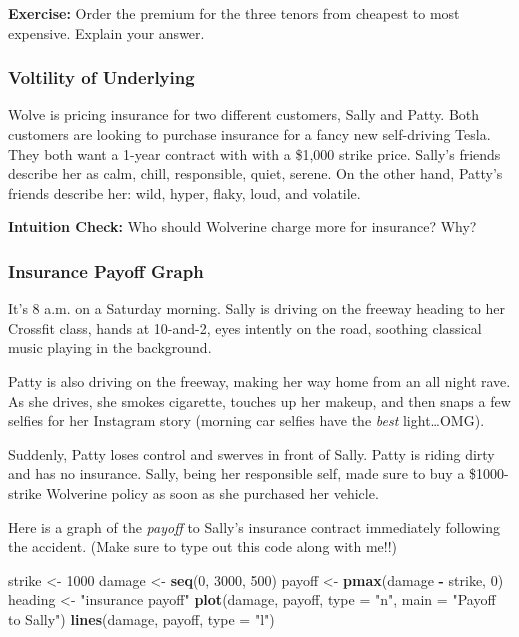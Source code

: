 \documentclass[11pt,]{krantz}
\makeatletter
\newenvironment{Shaded}{\begin{snugshade}}{\end{snugshade}}
\newcommand{\KeywordTok}[1]{\textcolor[rgb]{0.13,0.29,0.53}{\textbf{#1}}}
\newcommand{\DataTypeTok}[1]{\textcolor[rgb]{0.13,0.29,0.53}{#1}}
\newcommand{\DecValTok}[1]{\textcolor[rgb]{0.00,0.00,0.81}{#1}}
\newcommand{\StringTok}[1]{\textcolor[rgb]{0.31,0.60,0.02}{#1}}
\newcommand{\OperatorTok}[1]{\textcolor[rgb]{0.81,0.36,0.00}{\textbf{#1}}}
\newcommand{\NormalTok}[1]{#1}
\newenvironment{kframe}{%
\medskip{}
\setlength{\fboxsep}{.8em}
 \def\at@end@of@kframe{}%
 \ifinner\ifhmode%
  \def\at@end@of@kframe{\end{minipage}}%
  \begin{minipage}{\columnwidth}%
 \fi\fi%
 \def\FrameCommand##1{\hskip\@totalleftmargin \hskip-\fboxsep
 \colorbox{shadecolor}{##1}\hskip-\fboxsep
     \hskip-\linewidth \hskip-\@totalleftmargin \hskip\columnwidth}%
 \MakeFramed {\advance\hsize-\width
   \@totalleftmargin\z@ \linewidth\hsize
   \@setminipage}}%
 {\par\unskip\endMakeFramed%
 \at@end@of@kframe}
\renewenvironment{Shaded}{\begin{kframe}}{\end{kframe}}
\makeatother
\begin{document}
\textbf{Exercise:} Order the premium for the three tenors from cheapest to most expensive. Explain your answer.

\subsubsection*{Voltility of Underlying}\label{voltility-of-underlying}

Wolve is pricing insurance for two different customers, Sally and Patty. Both customers are looking to purchase insurance for a fancy new self-driving Tesla. They both want a 1-year contract with with a \$1,000 strike price. Sally's friends describe her as calm, chill, responsible, quiet, serene. On the other hand, Patty's friends describe her: wild, hyper, flaky, loud, and volatile.

\textbf{Intuition Check:} Who should Wolverine charge more for insurance? Why?

\subsubsection*{Insurance Payoff Graph}\label{insurance-payoff-graph}

It's 8 a.m. on a Saturday morning. Sally is driving on the freeway heading to her Crossfit class, hands at 10-and-2, eyes intently on the road, soothing classical music playing in the background.

Patty is also driving on the freeway, making her way home from an all night rave. As she drives, she smokes cigarette, touches up her makeup, and then snaps a few selfies for her Instagram story (morning car selfies have the \emph{best} light\ldots{}OMG).

Suddenly, Patty loses control and swerves in front of Sally. Patty is riding dirty and has no insurance. Sally, being her responsible self, made sure to buy a \$1000-strike Wolverine policy as soon as she purchased her vehicle.

Here is a graph of the \emph{payoff} to Sally's insurance contract immediately following the accident. (Make sure to type out this code along with me!!)

\begin{Shaded}
\begin{Highlighting}[]
\NormalTok{strike <-}\StringTok{ }\DecValTok{1000} 
\NormalTok{damage <-}\StringTok{ }\KeywordTok{seq}\NormalTok{(}\DecValTok{0}\NormalTok{, }\DecValTok{3000}\NormalTok{, }\DecValTok{500}\NormalTok{)}
\NormalTok{payoff <-}\StringTok{ }\KeywordTok{pmax}\NormalTok{(damage }\OperatorTok{-}\StringTok{ }\NormalTok{strike, }\DecValTok{0}\NormalTok{)}
\NormalTok{heading <-}\StringTok{ "insurance payoff"}
\KeywordTok{plot}\NormalTok{(damage, payoff, }\DataTypeTok{type =} \StringTok{"n"}\NormalTok{, }\DataTypeTok{main =} \StringTok{"Payoff to Sally"}\NormalTok{)}
\KeywordTok{lines}\NormalTok{(damage, payoff, }\DataTypeTok{type =} \StringTok{"l"}\NormalTok{)}
\end{Highlighting}
\end{Shaded}
\end{document}
